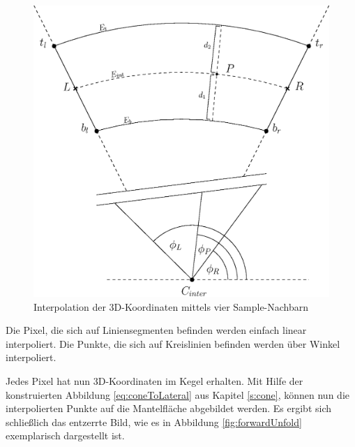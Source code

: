 \begin{figure}[!htb]
	\centering
	\includegraphics[scale=.6]{images/radialInterpolation.eps}
	\caption{Interpolation der 3D-Koordinaten mittels vier Sample-Nachbarn}
	\label{fig:radialInterpolation}
\end{figure}

Die Pixel, die sich auf Liniensegmenten befinden werden einfach linear interpoliert. Die Punkte, die sich auf Kreislinien befinden werden über Winkel interpoliert.

Jedes Pixel hat nun 3D-Koordinaten im Kegel erhalten. Mit Hilfe der konstruierten Abbildung \ref{eq:coneToLateral} aus Kapitel \ref{s:cone}, können nun die interpolierten Punkte auf die Mantelfläche abgebildet werden. Es ergibt sich schließlich das entzerrte Bild, wie es in Abbildung \ref{fig:forwardUnfold} exemplarisch dargestellt ist.



